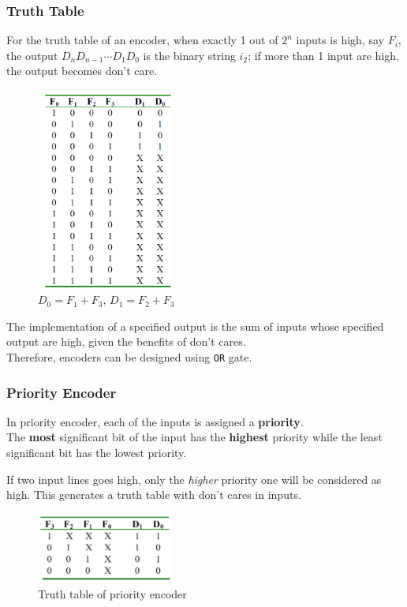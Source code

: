 \documentclass[12pt]{article}
\theoremstyle{definition}
\begin{document}
\subsubsection{Truth Table}
For the truth table of an encoder, when exactly 1 out of $2^n$ inputs is high, say $F_i$, the output $D_n D_{n-1}\cdots D_1 D_0$ is the binary string $i_2$; if more than 1 input are high, the output becomes don't care.
\clearpage
\begin{figure}[h]
\centering
\includegraphics[width = 0.4\textwidth]{7_2.png}
\caption{$D_0 = F_1+F_3$, $D_1 = F_2+F_3$}
\end{figure}
The implementation of a specified output is the sum of inputs whose specified output are high, given the benefits of don't cares. \\Therefore, encoders can be designed using \texttt{OR} gate.
\subsubsection{Priority Encoder}
In priority encoder, each of the inputs is assigned a \textbf{priority}.\\The \textbf{most} significant bit of the input has the \textbf{highest} priority while the least significant bit has the lowest priority.

If two input lines goes high, only the \textit{higher} priority one will be considered as high. This generates a truth table with don't cares in inputs.
\begin{figure}[h]
\centering
\includegraphics[width = 0.4\textwidth]{7_3.png}
\caption{Truth table of priority encoder}
\end{figure}
\end{document}
